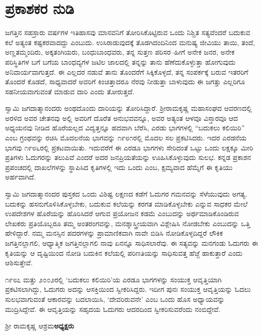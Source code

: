 
\chapter*{ಪ್ರಕಾಶಕರ ನುಡಿ}

ಜಗತ್ತಿನ ಸಹಸ್ರಾರು ವರ್ಷಗಳ ಇತಿಹಾಸವು ಮಾನವನಿಗೆ ತೋರಿಸಿಕೊಟ್ಟಿರುವ ಒಂದು ನಿಶ್ಚಿತ ಸತ್ಯವೆಂದರೆ ಬದುಕುವ ಕಲೆ ಅತ್ಯಂತ ಕಷ್ಟಕರವಾದದ್ದು ಎಂಬುದು. ಉಸಿರಾಡುವುದಕ್ಕೆ ತೊಡಗಿದಂದಿನಿಂದ ಮನುಷ್ಯ ಜೀವಿಯು ತಾಯಿ, ತಂದೆ, ಅಣ್ಣತಮ್ಮಂದಿರು, ಅಕ್ಕತಂಗಿಯರು, ಬಂಧುಬಾಂಧವರು, ತನ್ನ ಸುತ್ತಣ ಪರಿಸರ–ಹೀಗೆ ಅನೇಕ ಜನರ, ಅನೇಕ ಪರಿಸ್ಥಿತಿಗಳ ಬಗೆ ಬಗೆಯ ಬಾಂಧವ್ಯಗಳ ಜಟಿಲ ಜಾಲದಲ್ಲಿ ತನ್ನನ್ನು ತಾನು ಹೆಣೆದುಕೊಳ್ಳುತ್ತಾ ಹೋಗುವುದು ಅನಿವಾರ್ಯವಾಗುತ್ತದೆ. ಈ ಎಲ್ಲದರ ನಡುವೆ ತಾನು ತೊಂದರೆಗೆ ಸಿಕ್ಕಿಕೊಳ್ಳದೆ, ತನ್ನ ಸಂಪರ್ಕಕ್ಕೆ ಬರುವ ಇತರರಿಗೆ ತೊಂದರೆ ಕೊಡದೆ, ಸಾಧ್ಯವಾದರೆ ಅವರಿಗೆ ಕಿಂಚಿತ್ತಾದರೂ ನೆರವು ನೀಡುತ್ತಾ ಬಾಳುವುದು ಈ ಜಗತ್ತು ಎಲ್ಲರಿಗೂ ಸಹನೀಯವಾಗುವಂತೆ ಮಾಡುವ ದಾರಿ ಎಂದು ತೋರುತ್ತದೆ.

ಸ್ವಾಮಿ ಜಗದಾತ್ಮಾನಂದರು ಅಂಥದೊಂದು ದಾರಿಯನ್ನು ತೋರಿಸಿದ್ದಾರೆ. ಶ‍್ರೀರಾಮಕೃಷ್ಣ ಮಹಾಸಂಘದ ಆವರಣದಲ್ಲಿ ಅರಳಿದ ಅವರ ಚೇತನವು ಅಲ್ಲಿ ಅವರಿಗೆ ದೊರೆತ ಅನುಭವವನ್ನೂ, ಅವರ ಅತ್ಯಂತ ಆಳವೂ ವಿಸ್ತಾರವೂ ಆದ ಅಧ್ಯಯನವು ನೀಡಿದ ಹೊರೆಯಲ್ಲದ ವಿದ್ವತ್ತನ್ನೂ ಹದವಾಗಿ ಬೆರೆಸಿ, ಎರಡು ಭಾಗಗಳಲ್ಲಿ “ಬದುಕಲು ಕಲಿಯಿರಿ” ಎಂಬ ಗ್ರಂಥವನ್ನು ರಚಿಸಿ ಮೊದಲನೆಯ ಭಾಗವನ್ನು ೧೯೮೧ರಲ್ಲಿ ಮೊದಲ ಸಲ ಪ್ರಕಟಿಸಿದರು. ಇದರ ಎರಡನೆಯ ಭಾಗವು ೧೯೮೬ರಲ್ಲಿ ಪ್ರಕಟವಾಯಿತು. ಇದುವರೆಗೆ ಈ ಎರಡೂ ಭಾಗಗಳು ಸೇರಿದಂತೆ ಒಟ್ಟು ಒಂದು ಲಕ್ಷಕ್ಕೂ ಮೀರಿ ಪ್ರತಿಗಳು ಓದುಗರನ್ನು ತಲುಪಿವೆ ಎಂದರೆ ಅದರ ಜನಪ್ರಿಯತೆಯನ್ನು ಊಹಿಸಿಕೊಳ್ಳುವುದು ಸುಲಭ. ಕನ್ನಡ ಪ್ರಕಾಶನ ಪ್ರಪಂಚದಲ್ಲಿ ದಾಖಲೆಗಳನ್ನು ಸ್ಥಾಪಿಸಿದ ಕೃತಿಗಳಲ್ಲಿ ಇದು ಒಂದು ಎಂಬ, ಕ್ಷಮ್ಯವಾದ ಹೆಮ್ಮೆಗೆ ಈ ಕೃತಿಯು ಅರ್ಹವಾಗಿದೆ.

ಸ್ವಾಮಿ ಜಗದಾತ್ಮಾನಂದರ ಪುಸ್ತಕದ ಒಂದು ವಿಶಿಷ್ಟ ಲಕ್ಷಣದ ಕಡೆಗೆ ಓದುಗರ ಗಮನವನ್ನು ಸೆಳೆಯುವುದು ಅಗತ್ಯ. ಬದುಕನ್ನು ಹಸನುಗೊಳಿಸಿಕೊಳ್ಳಬೇಕು, ಬದುಕುವ ಕಲೆಯನ್ನು ಕರಗತ ಮಾಡಿಕೊಳ್ಳಬೇಕು ಎನ್ನುವ ಸಾಧಕರ ಮೇಲೆ ಉಪದೇಶಗಳ ಹೊರೆಯನ್ನು ಹೊರಿಸಿದರೆ ಆಗುವ ಪ್ರಯೋಜನ ಕಡಮೆ ಎಂಬುದನ್ನು ಅರ್ಥಮಾಡಿಕೊಂಡಿರುವ ಲೇಖಕರು ಪ್ರತಿಯೊಬ್ಬರೂ ತಮ್ಮ ಅಂತರಂಗವನ್ನು, ಮನಶ್ಶಾಸ್ತ್ರೀಯವಾಗಿ ವಿಶ್ಲೇಷಿಸಿ ನೋಡಬೇಕು ಎಂಬುದನ್ನು ಒತ್ತಿ ಹೇಳಿದ್ದಾರೆ. ನಮ್ಮ ಮನಸ್ಸಿನ ಪದರಗಳನ್ನು ಪ್ರಾಮಾಣಿಕವಾಗಿ ನಾವೇ ಬಿಡಿಸಿ ನೋಡಿಕೊಳ್ಳದಿದ್ದರೆ ಲೌಕಿಕ ಜಗತ್ತಿನಲ್ಲಾಗಲಿ, ಆಧ್ಯಾತ್ಮಿಕ ಜಗತ್ತಿನಲ್ಲಾಗಲಿ ನಾವು ಏನನ್ನೂ ಸಾಧಿಸಲಾರೆವು. ಈ ಸತ್ಯವನ್ನು ಮನಗಂಡು ಓದುಗರು ಈ ಕೃತಿಯನ್ನು ಆ ದೃಷ್ಟಿಯಿಂದ ನೋಡಿ ಬದುಕಿನ ಕಲೆಯಲ್ಲಿ ಪರಿಣತಿಯನ್ನು ಸಾಧಿಸುವತ್ತ ಹೆಜ್ಜೆ ಹಾಕುತ್ತಾರೆ ಎಂದು ಆಶಿಸುತ್ತೇವೆ.

೧೯೮೭ ಮತ್ತು ೨೦೦೨ರಲ್ಲಿ ‘ಬದುಕಲು ಕಲಿಯಿರಿ’ಯ ಎರಡೂ ಭಾಗಗಳನ್ನು ಸಂಯುಕ್ತ ಆವೃತ್ತಿಯಾಗಿ ಪ್ರಕಟಿಸಲಾಗಿದ್ದು, ಓದುಗರು ಅದನ್ನು ಆಸಕ್ತಿಯಿಂದ ಸ್ವೀಕರಿಸಿದ್ದರು. ಇದೀಗ ಪುನಃ ಸಂಯುಕ್ತ ಆವೃತ್ತಿಯನ್ನು ಓದಲು ಸುಲಭವಾಗುವಂತೆ ಆಕಾರವನ್ನು ಬದಲಾಯಿಸಿ, ‘ದೇವರಿರುವನೇ’ ಎಂಬ ಒಂದು ಹೊಸ ಅಧ್ಯಾಯವನ್ನು ಮುದ್ರಿಸಿದ್ದೇವೆ. ಈ ಆವೃತ್ತಿಯನ್ನು ಸಹೃದಯ ಓದುಗರು ಆದರದಿಂದ ಸ್ವೀಕರಿಸುವರೆಂದು ನಂಬಿದ್ದೇವೆ.

\bigskip

\noindent ಶ‍್ರೀ ರಾಮಕೃಷ್ಣ ಆಶ್ರಮ\hfill\textbf{ಅಧ್ಯಕ್ಷರು}


